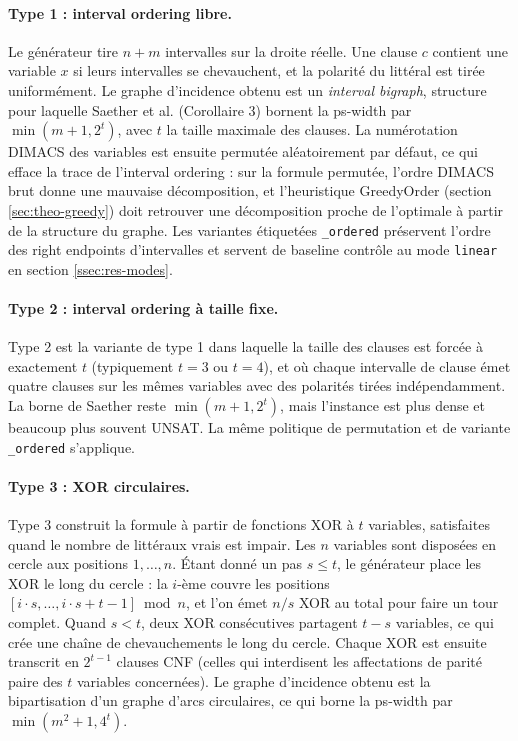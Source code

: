 \documentclass[11pt,a4paper]{report}
\theoremstyle{plain}
\theoremstyle{definition}
\begin{document}
\paragraph{Type 1 : interval ordering libre.}
Le générateur tire $n + m$ intervalles sur la droite réelle. Une
clause $c$ contient une variable $x$ si leurs intervalles se
chevauchent, et la polarité du littéral est tirée uniformément. Le
graphe d'incidence obtenu est un \emph{interval bigraph}, structure
pour laquelle Saether et al. (Corollaire 3) bornent la ps-width par
$\min(m + 1, 2^t)$, avec $t$ la taille maximale des clauses. La
numérotation DIMACS des variables est ensuite permutée
aléatoirement par défaut, ce qui efface la trace de l'interval
ordering : sur la formule permutée, l'ordre DIMACS brut donne une
mauvaise décomposition, et l'heuristique GreedyOrder
(section \ref{sec:theo-greedy}) doit retrouver une décomposition
proche de l'optimale à partir de la structure du graphe. Les
variantes étiquetées \texttt{\_ordered} préservent l'ordre des right
endpoints d'intervalles et servent de baseline contrôle au mode
\texttt{linear} en section \ref{ssec:res-modes}.

\paragraph{Type 2 : interval ordering à taille fixe.}
Type 2 est la variante de type 1 dans laquelle la taille des
clauses est forcée à exactement $t$ (typiquement $t = 3$ ou
$t = 4$), et où chaque intervalle de clause émet quatre clauses sur
les mêmes variables avec des polarités tirées indépendamment. La
borne de Saether reste $\min(m + 1, 2^t)$, mais l'instance est plus
dense et beaucoup plus souvent UNSAT. La même politique de
permutation et de variante \texttt{\_ordered} s'applique.

\paragraph{Type 3 : XOR circulaires.}
Type 3 construit la formule à partir de fonctions XOR à $t$
variables, satisfaites quand le nombre de littéraux vrais est
impair. Les $n$ variables sont disposées en cercle aux positions
$1, \ldots, n$. Étant donné un pas $s \leq t$, le générateur place
les XOR le long du cercle : la $i$-ème couvre les positions
$[i \cdot s, \ldots, i \cdot s + t - 1] \bmod n$, et l'on émet
$n / s$ XOR au total pour faire un tour complet. Quand $s < t$,
deux XOR consécutives partagent $t - s$ variables, ce qui crée une
chaîne de chevauchements le long du cercle. Chaque XOR est ensuite
transcrit en $2^{t-1}$ clauses CNF (celles qui interdisent les
affectations de parité paire des $t$ variables concernées). Le
graphe d'incidence obtenu est la bipartisation d'un graphe d'arcs
circulaires, ce qui borne la ps-width par $\min(m^2 + 1, 4^t)$.
\end{document}
